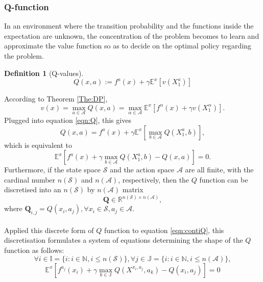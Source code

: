 \documentclass[11pt,twoside]{article}
\newtheorem{Definition}{Definition}
\numberwithin{Theorem}{section}
\numberwithin{Definition}{section}
\numberwithin{Lemma}{section}
\numberwithin{Algorithm}{section}
\numberwithin{equation}{section}
\begin{document}
\subsubsection{Q-function}
In an environment where the transition probability and the functions inside the expectation are unknown, the concentration of the problem becomes to learn and approximate the value function so as to decide on the optimal policy regarding the problem. 
\begin{Definition}[Q-values]
    \begin{equation}\label{eqn:Q}
        Q(x,a):=f^a(x)+\gamma\mathbb{E}^x\left[v(X^a_1)\right]
    \end{equation}
\end{Definition}\vspace{5mm}
According to Theorem \ref{The:DP},
$$
v(x)=\max_{a\in\mathcal{A}}Q(x,a)=\max_{\alpha\in\mathcal{A}}\mathbb{E}^x\left[f^{\alpha}(x)+\gamma v(X_1^{\alpha})\right].
$$
Plugged into equation \ref{eqn:Q}, this gives
\begin{equation}
Q(x,a)=f^a(x)+\gamma\mathbb{E}^x\left[\max_{b\in\mathcal{A}}Q(X_1^a,b)\right],
\end{equation}
which is equivalent to
\begin{equation}\label{eqn:contiQ}
    \mathbb{E}^x\left[f^a(x)+\gamma\max_{b\in\mathcal{A}}Q(X_1^a,b)-Q(x,a)\right]=0.
\end{equation}
Furthermore, if the state space $\mathcal{S}$ and the action space $\mathcal{A}$ are all finite, with the cardinal number $n(\mathcal{S})$ and $n(\mathcal{A})$, respectively, then the $Q$ function can be discretised into an $n(\mathcal{S})$ by $n(\mathcal{A})$ matrix 
$$
\mathbf{Q}\in\mathbb{R}^{n(\mathcal{S})\times n(\mathcal{A})},
$$
where $\mathbf{Q}_{i,j}=Q(x_i,a_j), \forall x_i\in\mathcal{S},a_j\in\mathcal{A}.$
\\\\
Applied this discrete form of $Q$ function to equation \ref{eqn:contiQ}, this discretisation formulates a system of equations determining the shape of the $Q$ function as follows:
\begin{equation*}
    \forall i\in \mathbb{I}=\{i:i\in\mathbb{N},i\leq n(\mathcal{S})\}, \forall j\in\mathbb{J}=\{i:i\in\mathbb{N},i\leq n(\mathcal{A})\},
\end{equation*}
\begin{equation}\label{eqn:discQ}
    \mathbb{E}^x\left[
    f^{a_j}(x_i)+\gamma\max_{k\in\mathbb{J}}Q(X^{x_i,a_j},a_k)-Q(x_i,a_j)
    \right]=0
\end{equation}
\end{document}
